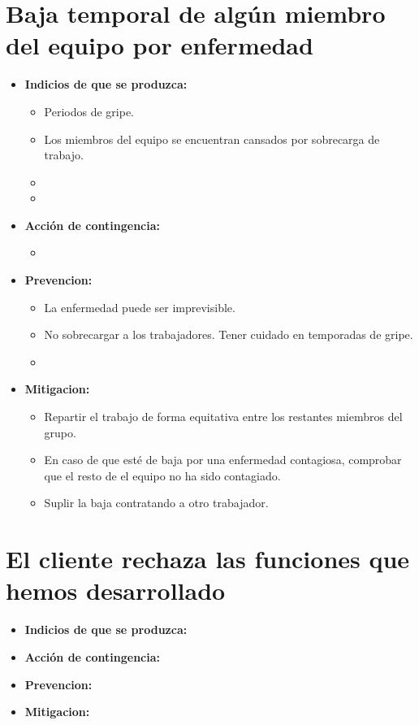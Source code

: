 \documentclass[spanish,a4paper,12pt]{report}	%
\begin{document}
	\section*{Baja temporal de algún miembro del equipo por enfermedad}
		\begin{itemize}
			\item \textbf {Indicios de que se produzca: }
				\begin{itemize}
				  \item  Periodos de gripe.
				  \item  Los miembros del equipo se encuentran cansados por sobrecarga de trabajo.
				  \item  
				  \item 
				\end{itemize} 
			\item \textbf {Acción de contingencia: }
				\begin{itemize}
					\item 
				\end{itemize}
			\item \textbf {Prevencion: }
				\begin{itemize}
				  \item La enfermedad puede ser imprevisible. 
				  \item No sobrecargar a los trabajadores. Tener cuidado en temporadas de gripe.
				  \item  
				\end{itemize} 
			\item \textbf {Mitigacion: }
				\begin{itemize}
					\item Repartir el trabajo de forma equitativa entre los restantes miembros del grupo.
					\item En caso de que esté de baja por una enfermedad contagiosa, comprobar que el resto de el equipo no ha sido contagiado.
					\item Suplir la baja contratando a otro trabajador.
				\end{itemize} 
		\end{itemize}
		
	\section*{El cliente rechaza las funciones que hemos desarrollado}
		\begin{itemize}
			\item \textbf {Indicios de que se produzca: }
			\item \textbf {Acción de contingencia: }
			\item \textbf {Prevencion: }
			\item \textbf {Mitigacion: }
		\end{itemize}
	
\end{document}
